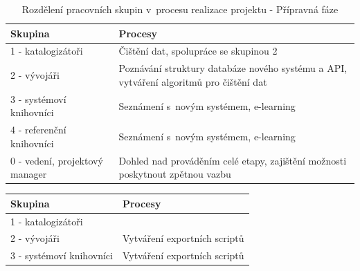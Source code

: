 \documentclass[
	11pt, oneside, printed, final, palatino, monochrome
	microtype,
	table,   %
	lof,     %
	lot     %
]{fithesis3}
\newcommand{\bold}[1]{\textbf{#1}}
\begin{document}
{\begin{table}
    \centering
    \begin{tabular}{| p{3cm} | p{8.3cm} |}
    \hline
    \bold{Skupina} 	
    & 
    \bold{Procesy} 
    \\ \hline
    
    1 - katalogizátoři 
    & 
    Čištění dat, spolupráce se skupinou 2 
    \\ \hline
    
    2 - vývojáři 
    & 
	Poznávání struktury databáze nového systému a API, vytváření algoritmů pro čištění dat	
    \\ \hline
    
    3 - systémoví knihovníci
    & 
    Seznámení s~novým systémem, e-learning
    \\ \hline
    
    4 - referenční knihovníci
    & 
    Seznámení s~novým systémem, e-learning
    \\ \hline

	0 - vedení, projektový manager
    & 
    Dohled nad prováděním celé etapy, zajištění možnosti poskytnout zpětnou vazbu
    \\ \hline
    
    \end{tabular}
    \caption{Rozdělení pracovních skupin v~procesu realizace projektu - Přípravná fáze}
\end{table}
    
\begin{table}
    \centering
    \begin{tabular}{| p{3cm} | p{8.3cm} |}
    \hline
    \bold{Skupina} 	
    & 
    \bold{Procesy} 
    \\ \hline
    
	1 - katalogizátoři
    & 
    
    \\ \hline
    
	2 - vývojáři
    & 
    Vytváření exportních scriptů
    \\ \hline
    
	3 - systémoví knihovníci
    & 
    Vytváření exportních scriptů
    \\ \hline
    

\end{tabular}
\end{table}}
\end{document}
